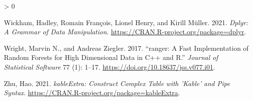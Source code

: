 \documentclass[]{elsarticle} %
\newlength{\cslhangindent}
\newenvironment{CSLReferences}[2] %
 {%
  \setlength{\parindent}{0pt}
  \ifodd #1 \everypar{\setlength{\hangindent}{\cslhangindent}}\ignorespaces\fi
  \ifnum #2 > 0
  \setlength{\parskip}{#2\baselineskip}
  \fi
 }%
 {}
\begin{document}
\begin{CSLReferences}{1}{0}
\leavevmode\hypertarget{ref-dplyr}{}%
Wickham, Hadley, Romain François, Lionel Henry, and Kirill Müller. 2021. \emph{Dplyr: A Grammar of Data Manipulation}. \url{https://CRAN.R-project.org/package=dplyr}.

\leavevmode\hypertarget{ref-ranger}{}%
Wright, Marvin N., and Andreas Ziegler. 2017. {``{ranger}: A Fast Implementation of Random Forests for High Dimensional Data in {C++} and {R}.''} \emph{Journal of Statistical Software} 77 (1): 1--17. \url{https://doi.org/10.18637/jss.v077.i01}.

\leavevmode\hypertarget{ref-kableExtra}{}%
Zhu, Hao. 2021. \emph{kableExtra: Construct Complex Table with 'Kable' and Pipe Syntax}. \url{https://CRAN.R-project.org/package=kableExtra}.

\end{CSLReferences}
\end{document}
